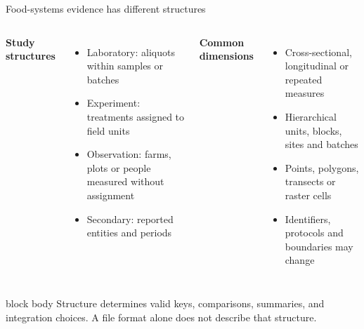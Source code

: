 \documentclass[10pt,aspectratio=169]{beamer}
\begin{document}
\begin{frame}{Food-systems evidence has different structures}

\small

\begin{columns}[T]


\textbf{Study structures}

\begin{itemize}
  \item Laboratory: aliquots within samples or batches
  \item Experiment: treatments assigned to field units
  \item Observation: farms, plots or people measured without assignment
  \item Secondary: reported entities and periods
\end{itemize}


\textbf{Common dimensions}

\begin{itemize}
  \item Cross-sectional, longitudinal or repeated measures
  \item Hierarchical units, blocks, sites and batches
  \item Points, polygons, transects or raster cells
  \item Identifiers, protocols and boundaries may change
\end{itemize}

\end{columns}

\vspace{0.35cm}

\begin{beamercolorbox}[rounded=true,sep=8pt]{block body}
Structure determines valid keys, comparisons, summaries, and integration choices. A file format alone does not describe that structure.
\end{beamercolorbox}

\end{frame}
\end{document}
